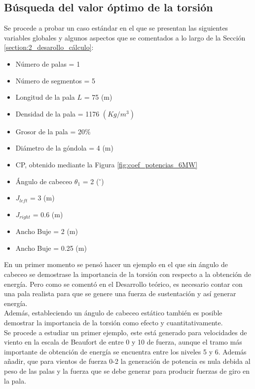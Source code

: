 \newpage


\subsection{Búsqueda del valor óptimo de la torsión}

Se procede a probar un caso estándar en el que se presentan las siguientes variables globales y algunos aspectos que se comentados a lo largo de la Sección \ref{section:2_desarollo_cálculo}: 

\begin{itemize}
  \item Número de palas = 1
  \item Número de segmentos = 5
  \item Longitud de la pala $L$ = 75 (m)
  \item Densidad de la pala = 1176 $(Kg/m^3)$
  \item Grosor de la pala = 20\%
  \item Diámetro de la góndola = 4 (m)
  \item CP, obtenido mediante la Figura \ref{fig:coef_potencias_6MW}
  \item Ángulo de cabeceo $\theta_1$ = 2 ($^{\circ}$)
  \item $J_{left}$ = 3 (m)
  \item $J_{right}$ = 0.6 (m)
  \item Ancho Buje = 2 (m)
  \item Ancho Buje = 0.25 (m)


\end{itemize}


En un primer momento se pensó hacer un ejemplo en el que sin ángulo de cabeceo se demostrase la importancia de la torsión con respecto a la obtención de energía. Pero como se comentó en el Desarrollo teórico, es necesario contar con una pala realista para que se genere una fuerza de sustentación y así generar energía. \\

Además, estableciendo un ángulo de cabeceo estático también es posible demostrar la importancia de la torsión como efecto y cuantitativamente.\\

Se procede a estudiar un primer ejemplo, este está generado para velocidades de viento en la escala de Beaufort de entre 0 y 10 de fuerza, aunque el tramo más importante de obtención de energía se encuentra entre los niveles 5 y 6. Además añadir, que para vientos de fuerza 0-2 la generación de potencia es nula debida al peso de las palas y la fuerza que se debe generar para producir fuerzas de giro en la pala.

